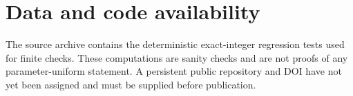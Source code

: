 \section*{Data and code availability}

The source archive contains the deterministic exact-integer regression tests
used for finite checks.  These computations are sanity checks and are not
proofs of any parameter-uniform statement.  A persistent public repository
and DOI have not yet been assigned and must be supplied before publication.
